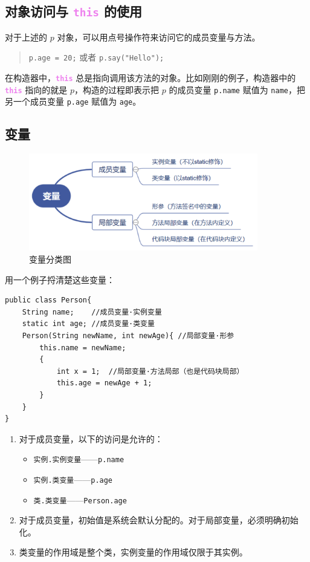 \documentclass[UTF8]{ctexart}
\newcommand\keyword[1]{\textcolor{violet}{\textbf{\texttt{#1}}}}
\begin{document}
\subsection{对象访问与 \keyword{this} 的使用}
对于上述的 $p$ 对象，可以用点号操作符来访问它的成员变量与方法。

\begin{quote}
  \verb!p.age = 20;! 或者 \verb!p.say("Hello");!
\end{quote}

在构造器中，\keyword{this} 总是指向调用该方法的对象。比如刚刚的例子，构造器中的 \keyword{this} 指向的就是 $p$，构造的过程即表示把 $p$ 的成员变量 \verb!p.name! 赋值为 \verb!name!，把另一个成员变量 \verb!p.age! 赋值为 \verb!age!。

\subsection{变量}
\begin{figure}[htb]
  \centering
  \includegraphics[width=10cm]{变量.png}
  \caption{变量分类图}\label{fig:variable}
\end{figure}

用一个例子捋清楚这些变量：
\begin{lstlisting}
public class Person{
    String name;    //成员变量·实例变量
    static int age; //成员变量·类变量
    Person(String newName, int newAge){ //局部变量·形参
        this.name = newName;
        {
            int x = 1;  //局部变量·方法局部（也是代码块局部）
            this.age = newAge + 1;
        }
    }
}
\end{lstlisting}

\begin{mybox}
\begin{enumerate}[itemsep=0pt,parsep=0pt]
  \item 对于成员变量，以下的访问是允许的：
  \begin{itemize}[itemsep=0pt,parsep=0pt]
    \item \verb!实例.实例变量!——\verb!p.name!
    \item \verb!实例.类变量!——\verb!p.age!
    \item \verb!类.类变量!——\verb!Person.age!
  \end{itemize}
  \item 对于成员变量，初始值是系统会默认分配的。对于局部变量，必须明确初始化。
  \item 类变量的作用域是整个类，实例变量的作用域仅限于其实例。
\end{enumerate}
\end{mybox}
\end{document}
